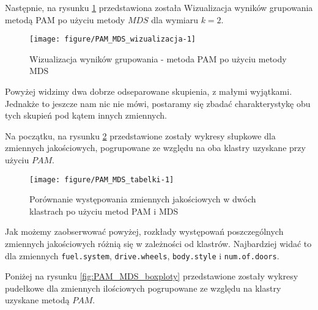 \documentclass[12pt, a4paper]{article}\usepackage[]{graphicx}\usepackage[]{xcolor}
\makeatletter
\def\maxwidth{ %
  \ifdim\Gin@nat@width>\linewidth
    \linewidth
  \else
    \Gin@nat@width
  \fi
}
\newenvironment{knitrout}{}{} %
\makeatother
\begin{document}
Następnie, na rysunku \ref{fig:PAM_MDS_wizualizacja} przedstawiona została Wizualizacja wyników grupowania metodą PAM po użyciu metody $MDS$ dla wymiaru $k=2$. 

\begin{knitrout}
\color{fgcolor}\begin{figure}[H]

{\centering \texttt{[image: figure/PAM\_MDS\_wizualizacja-1]} 

}

\caption[Wizualizacja wyników grupowania - metoda PAM po użyciu metody MDS]{Wizualizacja wyników grupowania - metoda PAM po użyciu metody MDS}\label{fig:PAM_MDS_wizualizacja}
\end{figure}

\end{knitrout}
Powyżej widzimy dwa dobrze odseparowane skupienia, z małymi wyjątkami. Jednakże to jeszcze nam nic nie mówi, postaramy się zbadać charakterystykę obu tych skupień pod kątem innych zmiennych.
\par Na początku, na rysunku \ref{fig:PAM_MDS_tabelki} przedstawione zostały wykresy słupkowe dla zmiennych jakościowych, pogrupowane ze względu na oba klastry uzyskane przy użyciu $PAM$.


\begin{knitrout}
\color{fgcolor}\begin{figure}[H]

{\centering \texttt{[image: figure/PAM\_MDS\_tabelki-1]} 

}

\caption[Porównanie występowania zmiennych jakościowych w dwóch klastrach po użyciu metod PAM i MDS]{Porównanie występowania zmiennych jakościowych w dwóch klastrach po użyciu metod PAM i MDS}\label{fig:PAM_MDS_tabelki}
\end{figure}

\end{knitrout}

Jak możemy zaobserwować powyżej, rozkłady występowań poszczególnych zmiennych jakościowych różnią się w zależności od klastrów. Najbardziej widać to dla zmiennych \texttt{fuel.system}, \texttt{drive.wheels}, \texttt{body.style} i \texttt{num.of.doors}.

\par Poniżej na rysunku \ref{fig:PAM_MDS_boxploty} przedstawione zostały wykresy pudełkowe dla zmiennych ilościowych pogrupowane ze względu na klastry uzyskane metodą $PAM$.
\end{document}
